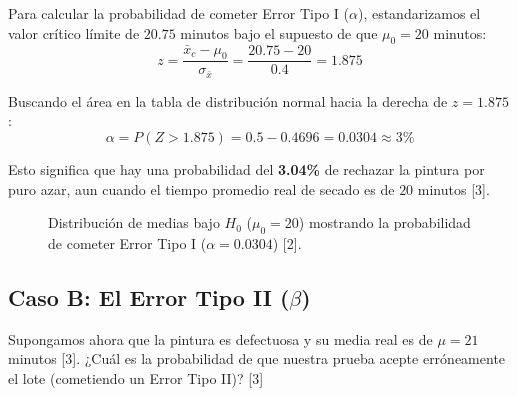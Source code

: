 \documentclass{article}
\begin{document}
Para calcular la probabilidad de cometer Error Tipo I ($\alpha$), estandarizamos el valor crítico límite de $20.75$ minutos bajo el supuesto de que $\mu_0 = 20$ minutos:
\[
z = \frac{\bar{x}_c - \mu_0}{\sigma_{\bar{x}}} = \frac{20.75 - 20}{0.4} = 1.875
\]

Buscando el área en la tabla de distribución normal hacia la derecha de $z=1.875$:
\[
\alpha = P(Z > 1.875) = 0.5 - 0.4696 = 0.0304 \approx 3\%
\]

Esto significa que hay una probabilidad del \textbf{3.04\%} de rechazar la pintura por puro azar, aun cuando el tiempo promedio real de secado es de $20$ minutos [3].

\begin{figure}[h!]
\centering
{}
\caption{Distribución de medias bajo $H_0$ ($\mu_0 = 20$) mostrando la probabilidad de cometer Error Tipo I ($\alpha = 0.0304$) [2].}
\end{figure}

\subsection{Caso B: El Error Tipo II ($\beta$)}
Supongamos ahora que la pintura es defectuosa y su media real es de $\mu = 21$ minutos [3]. ¿Cuál es la probabilidad de que nuestra prueba acepte erróneamente el lote (cometiendo un Error Tipo II)? [3]
\end{document}
